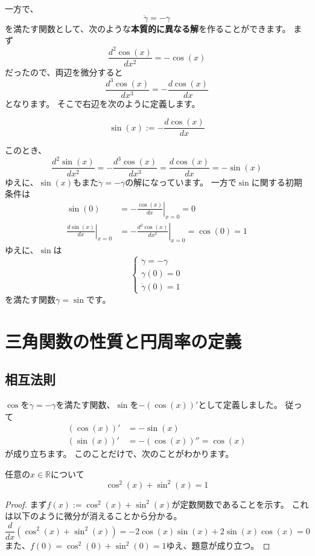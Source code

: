 一方で、
\[
  \ddot\gamma=-\gamma
\]
を満たす関数として、次のような\textbf{本質的に異なる解}を作ることができます。
まず
\[
  \frac{d^2\cos(x)}{dx^2}=-\cos(x)
\]
だったので、両辺を微分すると
\[
  \frac{d^3\cos(x)}{dx^3}=-\frac{d\cos(x)}{dx}
\]
となります。
そこで右辺を次のように定義します。
\begin{definition}
  \[
    \sin(x):=-\frac{d\cos(x)}{dx}
  \]
\end{definition}
このとき、
\[
  \frac{d^2\sin(x)}{dx^2}=-\frac{d^3\cos(x)}{dx^3}=\frac{d\cos(x)}{dx}=-\sin(x)
\]
ゆえに、$\sin(x)$もまた$\ddot\gamma=-\gamma$の解になっています。
一方で$\sin$に関する初期条件は
\begin{align*}
  \sin(0)&=-\left.\frac{\cos(x)}{dx}\right|_{x=0}=0\\
  \left.\frac{d\sin(x)}{dx}\right|_{x=0}&=-\left.\frac{d^2\cos(x)}{dx^2}\right|_{x=0}=\cos(0)=1
\end{align*}
ゆえに、$\sin$は
\[
  \begin{cases}
    \ddot{\gamma}=-\gamma\\
    \gamma(0)=0\\
    \dot\gamma(0)=1
  \end{cases}
\]
を満たす関数$\gamma=\sin$です。



\section{三角関数の性質と円周率の定義}

\subsection{相互法則}

$\cos$を$\ddot\gamma=-\gamma$を満たす関数、$\sin$を$-(\cos(x))'$として定義しました。
従って
\begin{align*}
  (\cos(x))'&=-\sin(x)\\
  (\sin(x))'&=-(\cos(x))''=\cos(x)
\end{align*}
が成り立ちます。
このことだけで、次のことがわかります。
\begin{theorem}[三角関数の相互法則]
  任意の$x\in\mathbb{R}$について
  \[
    \cos^2(x)+\sin^2(x)=1
  \]
\end{theorem}
\begin{proof}
  まず$f(x):=\cos^2(x)+\sin^2(x)$が定数関数であることを示す。
  これは以下のように微分が消えることから分かる。
  \[
    \frac{d}{dx}(\cos^2(x)+\sin^2(x))=-2\cos(x)\sin(x)+2\sin(x)\cos(x)=0
  \]
  また、$f(0)=\cos^2(0)+\sin^2(0)=1$ゆえ、題意が成り立つ。
\end{proof}

